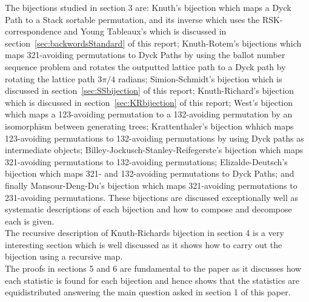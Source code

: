\documentclass[12pt]{article}
\begin{document}
The bijections studied in section 3 are: Knuth's bijection which maps a Dyck Path to a Stack sortable permutation, and its inverse which uses the RSK-correspondence and Young Tableaux's which is discussed in section~\ref{sec:backwordsStandard} of this report; Knuth-Rotem's bijections which maps 321-avoiding permutations to Dyck Paths by using the ballot number sequence problem and rotates the outputted lattice path to a Dyck path by rotating the lattice path $3\pi/4$ radians; Simion-Schmidt's bijection which is discussed in section~\ref{sec:SSbijection} of this report; Knuth-Richard's bijection which is discussed in section~\ref{sec:KRbijection} of this report; West's bijection which maps a 123-avoiding permutation to a 132-avoiding permutation by an isomorphism between generating trees; Krattenthaler's bijection whhich maps 123-avoiding permutations to 132-avoiding permutations by using Dyck paths as intermediate objects; Billey-Jockusch-Stanley-Reifegerste's bijection which maps 321-avoiding permutations to 132-avoiding permutations; Elizalde-Deutsch's bijection which maps 321- and 132-avoiding permutations to Dyck Paths; and finally Mansour-Deng-Du's bijection which maps 321-avoiding permutations to 231-avoiding permutations. These bijections are discussed exceptionally well as systematic descriptions of each bijection and how to compose and decompose each is given.\\
The recursive description of Knuth-Richards bijection in section 4 is a very interesting section which is well discussed as it shows how to carry out the bijection using a recursive map.\\
The proofs in sections 5 and 6 are fundamental to the paper as it discusses how each statistic is found for each bijection and hence shows that the statistics are equidistributed answering the main question asked in section 1 of this paper.
\end{document}
